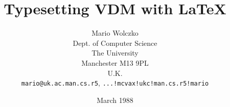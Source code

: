 
\title{Typesetting VDM with \LaTeX}
\author{Mario Wolczko\\
Dept. of Computer Science\\
The University\\
Manchester M13 9PL\\
U.K.\\
\verb;mario@uk.ac.man.cs.r5;, {\tt ...!mcvax!ukc!man.cs.r5!mario}}
\date{March 1988}

\newcommand{\Vdm}{{\tt vdm\/}}

\newenvironment{dangerous}{\endgraf\vspace{5pt}\bgroup\small}%
			  {\endgraf\egroup\vspace{5pt}}

\newlength{\righthalf} \setlength{\righthalf}{0.5\textwidth}
\newlength{\lefthalf}  \setlength{\lefthalf}{0.4\textwidth}
\newenvironment{leftside}{\noindent\hspace{0.1\textwidth}%
			  \parbox[t]{\lefthalf}\bgroup\vspace{10pt}%
			  \noindent\begin{vdm}\leftskip=0pt\VDMindent=0pt}%
			 {\end{vdm}\egroup}
